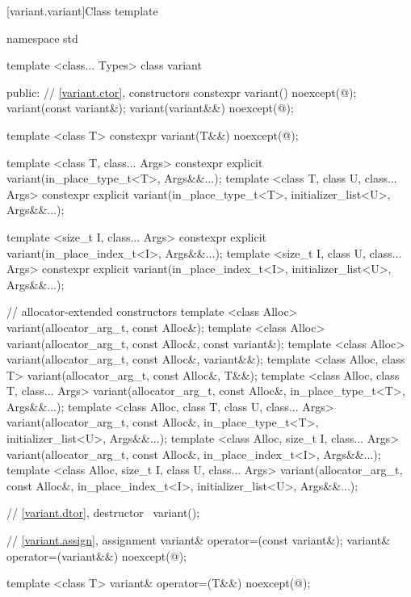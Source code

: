 %
[variant.variant]{Class template }

\begin{codeblock}
namespace std {
  template <class... Types>
    class variant {
    public:
      // \ref{variant.ctor}, constructors
      constexpr variant() noexcept(@\seebelow@);
      variant(const variant&);
      variant(variant&&) noexcept(@\seebelow@);

      template <class T>
        constexpr variant(T&&) noexcept(@\seebelow@);

      template <class T, class... Args>
        constexpr explicit variant(in_place_type_t<T>, Args&&...);
      template <class T, class U, class... Args>
        constexpr explicit variant(in_place_type_t<T>, initializer_list<U>, Args&&...);

      template <size_t I, class... Args>
        constexpr explicit variant(in_place_index_t<I>, Args&&...);
      template <size_t I, class U, class... Args>
        constexpr explicit variant(in_place_index_t<I>, initializer_list<U>, Args&&...);

      // allocator-extended constructors
      template <class Alloc>
        variant(allocator_arg_t, const Alloc&);
      template <class Alloc>
        variant(allocator_arg_t, const Alloc&, const variant&);
      template <class Alloc>
        variant(allocator_arg_t, const Alloc&, variant&&);
      template <class Alloc, class T>
        variant(allocator_arg_t, const Alloc&, T&&);
      template <class Alloc, class T, class... Args>
        variant(allocator_arg_t, const Alloc&, in_place_type_t<T>, Args&&...);
      template <class Alloc, class T, class U, class... Args>
        variant(allocator_arg_t, const Alloc&, in_place_type_t<T>,
                initializer_list<U>, Args&&...);
      template <class Alloc, size_t I, class... Args>
        variant(allocator_arg_t, const Alloc&, in_place_index_t<I>, Args&&...);
      template <class Alloc, size_t I, class U, class... Args>
        variant(allocator_arg_t, const Alloc&, in_place_index_t<I>,
                initializer_list<U>, Args&&...);

      // \ref{variant.dtor}, destructor
      ~variant();

      // \ref{variant.assign}, assignment
      variant& operator=(const variant&);
      variant& operator=(variant&&) noexcept(@\seebelow@);

      template <class T> variant& operator=(T&&) noexcept(@\seebelow@);

}}
\end{codeblock}

